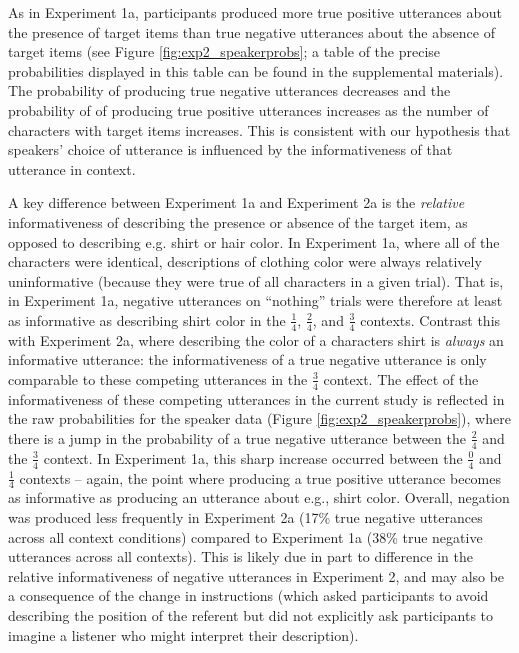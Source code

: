 \documentclass[man, floatsintext, noapacite]{apa6}
\begin{document}
As in Experiment 1a, participants produced more true positive utterances about the presence of target items than true negative utterances about the absence of target items (see Figure \ref{fig:exp2_speakerprobs}; a table of the precise probabilities displayed in this table can be found in the supplemental materials). The probability of producing true negative utterances decreases and the probability of of producing true positive utterances increases as the number of characters with target items increases. This is consistent with our hypothesis that speakers' choice of utterance is influenced by the informativeness of that utterance in context. 

A key difference between Experiment 1a and Experiment 2a is the \textit{relative} informativeness of describing the presence or absence of the target item, as opposed to describing e.g. shirt or hair color. In Experiment 1a, where all of the characters were identical, descriptions of clothing color were always relatively uninformative (because they were true of all characters in a given trial). That is, in Experiment 1a, negative utterances on ``nothing'' trials were therefore at least as informative as describing shirt color in the $\frac{1}{4}$, $\frac{2}{4}$, and $\frac{3}{4}$ contexts. Contrast this with Experiment 2a, where describing the color of a characters shirt is \textit{always} an informative utterance: the informativeness of a true negative utterance is only comparable to these competing utterances in the $\frac{3}{4}$ context. The effect of the informativeness of these competing utterances in the current study is reflected in the raw probabilities for the speaker data (Figure \ref{fig:exp2_speakerprobs}), where there is a jump in the probability of a true negative utterance between the $\frac{2}{4}$ and the $\frac{3}{4}$ context. In Experiment 1a, this sharp increase occurred between the $\frac{0}{4}$ and $\frac{1}{4}$ contexts -- again, the point where producing a true positive utterance becomes as informative as producing an utterance about e.g., shirt color. Overall, negation was produced less frequently in Experiment 2a (17\% true negative utterances across all context conditions) compared to Experiment 1a (38\% true negative utterances across all contexts). This is likely due in part to difference in the relative informativeness of negative utterances in Experiment 2, and may also be a consequence of the change in instructions (which asked participants to avoid describing the position of the referent but did not explicitly ask participants to imagine a listener who might interpret their description). 
\end{document}
